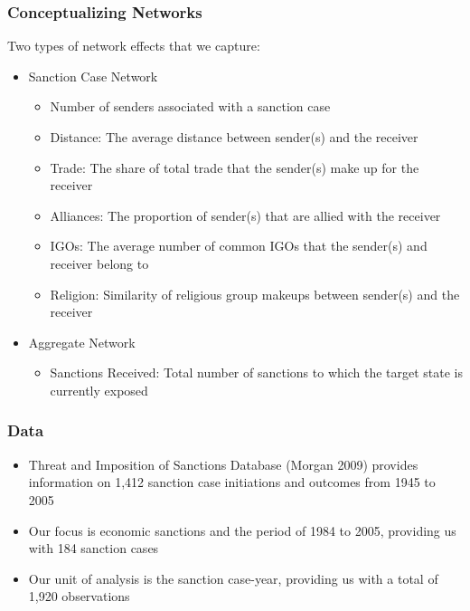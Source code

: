 \begin{frame}
\frametitle{Conceptualizing Networks}

Two types of network effects that we capture:

\begin{itemize}
	\item Sanction Case Network
	\begin{itemize}
		\item Number of senders associated with a sanction case
		\item Distance: The average distance between sender(s) and the receiver
		\item Trade: The share of total trade that the sender(s) make up for the receiver		
		\item Alliances: The proportion of sender(s) that are allied with the receiver
		\item IGOs: The average number of common IGOs that the sender(s) and receiver belong to
		\item Religion: Similarity of religious group makeups between sender(s) and the receiver
	\end{itemize}
	\item Aggregate Network
	\begin{itemize}
		\item Sanctions Received: Total number of sanctions to which the target state is currently exposed
	\end{itemize}
\end{itemize}

\end{frame}

\begin{frame}
\frametitle{Data}

\begin{itemize}
	\item Threat and Imposition of Sanctions Database (Morgan 2009) provides information on 1,412 sanction case initiations and outcomes from 1945 to 2005 
		\vspace{0.1cm}
	\item Our focus is economic sanctions and the period of 1984 to 2005, providing us with 184 sanction cases \\
		\vspace{0.1cm}
	\item Our unit of analysis is the sanction case-year, providing us with a total of 1,920 observations
\end{itemize}

\end{frame}



